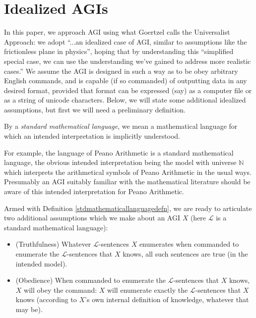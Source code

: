 \documentclass[runningheads]{llncs}
\begin{document}
\section{Idealized AGIs}
\label{agisection}



In this paper, we approach AGI using what
Goertzel \cite{goertzel2014artificial} calls
the Universalist Approach:
we adopt ``...an idealized case of AGI, similar to
assumptions like the frictionless plane in physics'', hoping that by
understanding this ``simplified special
case, we can use the understanding we've gained to address more realistic
cases.'' We assume the AGI is designed in such a way as to be obey arbitrary
English commands, and is capable (if so commanded) of outputting data in
any desired format, provided that format can be expressed (say) as a computer
file or as a string of unicode characters. Below, we will state some additional
idealized assumptions, but first we will need a preliminary definition.

\begin{definition}
\label{stdmathematicallanguagedefn}
By a \emph{standard mathematical language}, we mean a mathematical language for which an
intended interpretation is implicitly understood.
\end{definition}

For example, the
language of Peano Arithmetic is a standard mathematical language, the obvious
intended interpretation being the model with universe $\mathbb N$ which
interprets the arithmetical symbols of Peano Arithmetic in the usual ways.
Presumably an AGI suitably familiar with the mathematical literature should
be aware of this intended interpretation for Peano Arithmetic.

Armed with Definition \ref{stdmathematicallanguagedefn}, we are ready to articulate
two additional assumptions which we make about an AGI $X$
(here $\mathscr L$ is a standard mathematical language):
\begin{itemize}
  \item (Truthfulness) Whatever $\mathscr L$-sentences $X$ enumerates
  when commanded to enumerate the $\mathscr L$-sentences that $X$ knows,
  all such sentences are true (in the intended model).
  \item (Obedience) When commanded to enumerate the $\mathscr L$-sentences that $X$ knows,
  $X$ will obey the command: $X$ will enumerate exactly the
  $\mathscr L$-sentences that $X$ knows (according to $X$'s own internal definition
  of knowledge, whatever that may be).
\end{itemize}
\end{document}
